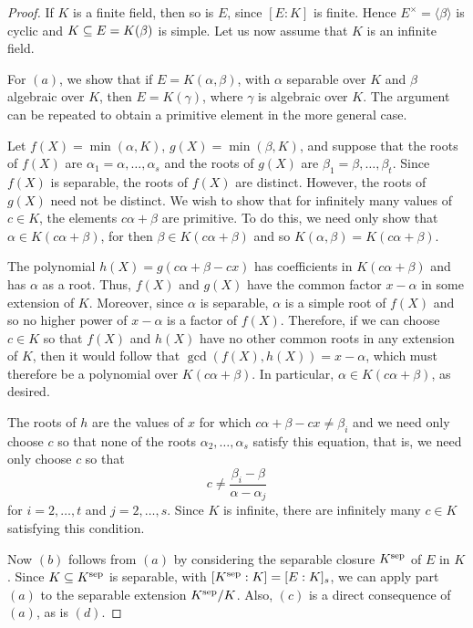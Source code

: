 \begin{proof}
If $K$ is a finite field, then so is $E$, since $[E:K]$ is finite. Hence $E^\times=\langle\beta\rangle$ is cyclic and $K\subseteq E=K(\beta)$ is simple. Let us now assume that $K$ is an infinite field.\par
For $(a)$, we show that if $E=K(\alpha,\beta)$, with $\alpha$ separable over $K$ and $\beta$ algebraic over $K$, then $E=K(\gamma)$, where $\gamma$ is algebraic over $K$. The argument can be repeated to obtain a primitive element in the more general case.\par
Let $f(X)=\min(\alpha,K)$, $g(X)=\min(\beta,K)$, and suppose that the roots of $f(X)$ are $\alpha_1=\alpha,\dots,\alpha_s$ and the roots of $g(X)$ are $\beta_1=\beta,\dots,\beta_t$. Since $f(X)$ is separable, the roots of $f(X)$ are distinct. However, the roots of $g(X)$ need not be distinct. We wish to show that for infinitely many values of $c\in K$, the elements $c\alpha+\beta$ are primitive. To do this, we need only show that $\alpha\in K(c\alpha+\beta)$, for then $\beta\in K(c\alpha+\beta)$ and so $K(\alpha,\beta)=K(c\alpha+\beta)$.\par
The polynomial $h(X)=g(c\alpha+\beta-cx)$ has coefficients in $K(c\alpha+\beta)$ and has $\alpha$ as a root. Thus, $f(X)$ and $g(X)$ have the common factor $x-\alpha$ in some extension of $K$. Moreover, since $\alpha$ is separable, $\alpha$ is a simple root of $f(X)$ and so no higher power of $x-\alpha$ is a factor of $f(X)$. Therefore, if we can choose $c\in K$ so that $f(X)$ and $h(X)$ have no other common roots in any extension of $K$, then it would follow that $\gcd(f(X),h(X))=x-\alpha$, which must therefore be a polynomial over $K(c\alpha+\beta)$. In particular, $\alpha\in K(c\alpha+\beta)$, as desired.\par
The roots of $h$ are the values of $x$ for which $c\alpha+\beta-cx\neq\beta_i$ and we need only choose $c$ so that none of the roots $\alpha_2,\dots,\alpha_s$ satisfy this equation, that is, we need only choose $c$ so that
\[c\neq\frac{\beta_i-\beta}{\alpha-\alpha_j}\]
for $i=2,\dots,t$ and $j=2,\dots,s$. Since $K$ is infinite, there are infinitely many $c\in K$ satisfying this condition.\par
Now $(b)$ follows from $(a)$ by considering the separable closure $K^{\mathrm{sep}}$ of $E$ in $K$. Since $K\subseteq K^{\mathrm{sep}}$ is separable, with $[K^{\mathrm{sep}}:K]=[E:K]_s$, we can apply part $(a)$ to the separable extension $K^{\mathrm{sep}}/K$. Also, $(c)$ is a direct consequence of $(a)$, as is $(d)$.
\end{proof}
